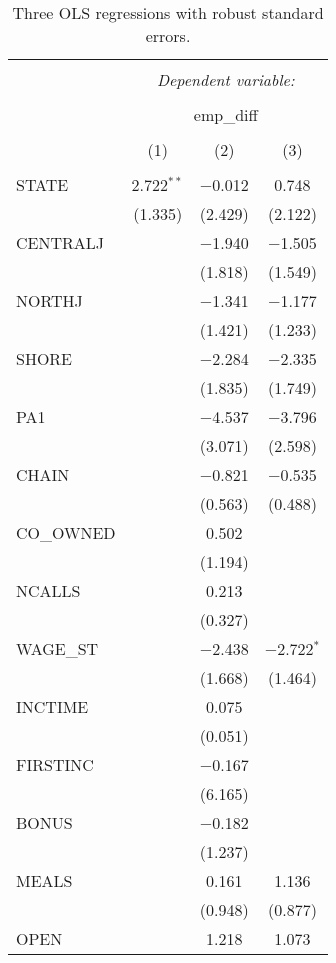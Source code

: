 
\begin{table}[H] \centering 
  \caption{Three OLS regressions with robust standard errors.} 
  \label{} 
\begin{tabular}{@{\extracolsep{5pt}}lccc} 
\\[-1.8ex]\hline 
\hline \\[-1.8ex] 
 & \multicolumn{3}{c}{\textit{Dependent variable:}} \\ 
\cline{2-4} 
\\[-1.8ex] & \multicolumn{3}{c}{emp\_diff} \\ 
\\[-1.8ex] & (1) & (2) & (3)\\ 
\hline \\[-1.8ex] 
 STATE & 2.722$^{**}$ & $-$0.012 & 0.748 \\ 
  & (1.335) & (2.429) & (2.122) \\ 
  CENTRALJ &  & $-$1.940 & $-$1.505 \\ 
  &  & (1.818) & (1.549) \\ 
  NORTHJ &  & $-$1.341 & $-$1.177 \\ 
  &  & (1.421) & (1.233) \\ 
  SHORE &  & $-$2.284 & $-$2.335 \\ 
  &  & (1.835) & (1.749) \\ 
  PA1 &  & $-$4.537 & $-$3.796 \\ 
  &  & (3.071) & (2.598) \\ 
  CHAIN &  & $-$0.821 & $-$0.535 \\ 
  &  & (0.563) & (0.488) \\ 
  CO\_OWNED &  & 0.502 &  \\ 
  &  & (1.194) &  \\ 
  NCALLS &  & 0.213 &  \\ 
  &  & (0.327) &  \\ 
  WAGE\_ST &  & $-$2.438 & $-$2.722$^{*}$ \\ 
  &  & (1.668) & (1.464) \\ 
  INCTIME &  & 0.075 &  \\ 
  &  & (0.051) &  \\ 
  FIRSTINC &  & $-$0.167 &  \\ 
  &  & (6.165) &  \\ 
  BONUS &  & $-$0.182 &  \\ 
  &  & (1.237) &  \\ 
  MEALS &  & 0.161 & 1.136 \\ 
  &  & (0.948) & (0.877) \\ 
  OPEN &  & 1.218 & 1.073 \\ 

\end{tabular}
\end{table}
